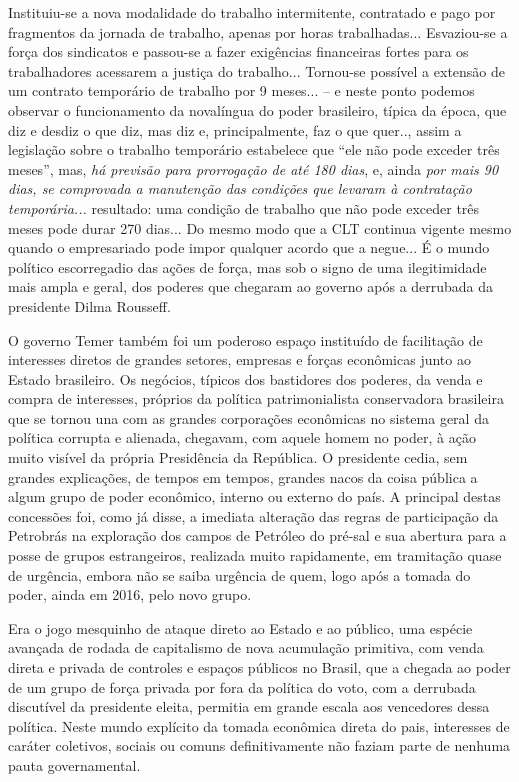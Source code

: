 Instituiu-se a nova modalidade do trabalho intermitente, contratado e
pago por fragmentos da jornada de trabalho, apenas por horas
trabalhadas... Esvaziou-se a força dos sindicatos e passou-se a fazer
exigências financeiras fortes para os trabalhadores acessarem a justiça
do trabalho... Tornou-se possível a extensão de um contrato temporário
de trabalho por 9 meses... -- e neste ponto podemos observar o
funcionamento da novalíngua do poder brasileiro, típica da época, que
diz e desdiz o que diz, mas diz e, principalmente, faz o que quer..,
assim a legislação sobre o trabalho temporário estabelece que ``ele não
pode exceder três meses'', mas, \emph{há previsão para prorrogação de
até 180 dias}, e, ainda \emph{por mais 90 dias, se comprovada a
manutenção das condições que levaram à contratação temporária...}
resultado: uma condição de trabalho que não pode exceder três meses pode
durar 270 dias... Do mesmo modo que a CLT continua vigente mesmo quando
o empresariado pode impor qualquer acordo que a negue... É o mundo
político escorregadio das ações de força, mas sob o signo de uma
ilegitimidade mais ampla e geral, dos poderes que chegaram ao governo
após a derrubada da presidente Dilma Rousseff.

O governo Temer também foi um poderoso espaço instituído de facilitação
de interesses diretos de grandes setores, empresas e forças econômicas
junto ao Estado brasileiro. Os negócios, típicos dos bastidores dos
poderes, da venda e compra de interesses, próprios da política
patrimonialista conservadora brasileira que se tornou una com as grandes
corporações econômicas no sistema geral da política corrupta e alienada,
chegavam, com aquele homem no poder, à ação muito visível da própria
Presidência da República. O presidente cedia, sem grandes explicações,
de tempos em tempos, grandes nacos da coisa pública a algum grupo de
poder econômico, interno ou externo do país. A principal destas
concessões foi, como já disse, a imediata alteração das regras de
participação da Petrobrás na exploração dos campos de Petróleo do
pré-sal e sua abertura para a posse de grupos estrangeiros, realizada
muito rapidamente, em tramitação quase de urgência, embora não se saiba
urgência de quem, logo após a tomada do poder, ainda em 2016, pelo novo
grupo.

Era o jogo mesquinho de ataque direto ao Estado e ao público, uma
espécie avançada de rodada de capitalismo de nova acumulação primitiva,
com venda direta e privada de controles e espaços públicos no Brasil,
que a chegada ao poder de um grupo de força privada por fora da política
do voto, com a derrubada discutível da presidente eleita, permitia em
grande escala aos vencedores dessa política. Neste mundo explícito da
tomada econômica direta do pais, interesses de caráter coletivos,
sociais ou comuns definitivamente não faziam parte de nenhuma pauta
governamental.

